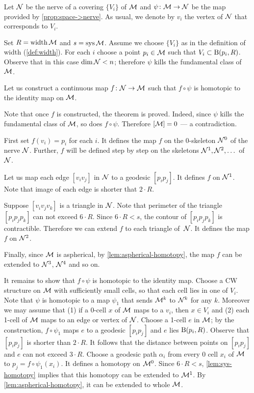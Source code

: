 Let $\mathcal{N}$ be the nerve of a covering $\{V_i\}$ of $\mathcal{M}$ and $\psi\colon\mathcal{M}\to\mathcal{N}$ be the map provided by \ref{prop:space->nerve}.
As usual, we denote by $v_i$ the vertex of $\mathcal{N}$ that corresponds to $V_i$.

Set $R=\operatorname{\rm width}\nolimits \mathcal{M}$ and $s=\mathop{\rm sys}\nolimits\mathcal{M}$.
Assume we choose $\{V_i\}$ as in the definition of width (\ref{def:width}).
For each $i$ choose a point $p_i\in \mathcal{M}$ such that $V_i\subset \mathrm{B}{}(p_i,R)$.
Observe that in this case $\operatorname{\rm dim}\nolimits\mathcal{N}<n$;
therefore $\psi$ kills the fundamental class of $\mathcal{M}$.

Let us construct a continuous map  $f\colon\mathcal{N}\to  \mathcal{M}$ such that
$f\circ\psi$ is homotopic to the identity map on $\mathcal{M}$.

Note that once $f$ is constructed, the theorem is proved.
Indeed, since $\psi$ kills the fundamental class of $\mathcal{M}$, so does $f\circ\psi$.
Therefore $[\mathcal{M}]=0$ --- a contradiction.

First set $f(v_i)=p_i$ for each $i$.
It defines the map $f$ on the 0-skeleton $\mathcal{N}^0$ of the nerve $\mathcal{N}$.
Further, $f$ will be defined step by step on the skeletons $\mathcal{N}^1,\mathcal{N}^2, \dots$ of $\mathcal{N}$.

Let us map each edge $[v_iv_j]$ in $\mathcal{N}$ to a geodesic $[p_ip_j]$.
It defines $f$ on $\mathcal{N}^1$.
Note that image of each edge is shorter that $2\cdot R$.

Suppose $[v_iv_jv_k]$ is a triangle in $\mathcal{N}$.
Note that perimeter of the triangle $[p_ip_jp_k]$ can not exceed $6\cdot R$.
Since $6\cdot R<s$, the contour of $[p_ip_jp_k]$ is contractible.
Therefore we can extend $f$ to each triangle of~$\mathcal{N}$.
It defines the map $f$ on $\mathcal{N}^2$.

Finally, since $\mathcal{M}$ is aspherical, by \ref{lem:aspherical-homotopy}, the map $f$ can be extended to $\mathcal{N}^3$, $\mathcal{N}^4$ and so on.

It remains to show that $f\circ\psi$ is homotopic to the identity map.
Choose a CW structure on $\mathcal{M}$ with sufficiently small cells, so that each cell lies in one of $V_i$.
Note that $\psi$ is homotopic to a map $\psi_1$ that sends $\mathcal{M}^k$ to $\mathcal{N}^k$ for any $k$.
Moreover we may assume that (1) if a 0-cell $x$ of $\mathcal{M}$ maps to a $v_i$, then $x\in V_i$ and (2) each 1-cell  of $\mathcal{M}$ maps to an edge or vertex of $\mathcal{N}$.
Choose a 1-cell $e$ in $\mathcal{M}$; by the construction, $f\circ\psi_1$ maps $e$ to a geodesic $[p_ip_j]$ and $e$ lies $\mathrm{B}{}(p_i,R)$.
Observe that $[p_ip_j]$ is shorter than $2\cdot R$.
It follows that the distance between points on $[p_ip_j]$ and $e$ can not exceed $3\cdot R$.
Choose a geodesic path $\alpha_i$ from every 0 cell $x_i$  of $\mathcal{M}$ to $p_j=f\circ\psi_1(x_i)$.
It defines a homotopy on $\mathcal{M}^0$.
Since $6\cdot R<s$, \ref{lem:sys-homotopy} implies that this homotopy can be extended to $\mathcal{M}^1$.
By \ref{lem:aspherical-homotopy}, it can be extended to whole $\mathcal{M}$.
\qeds


